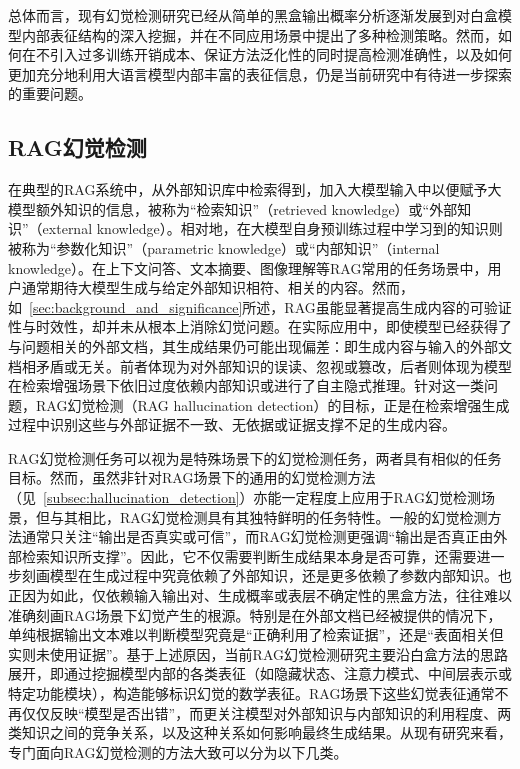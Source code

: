 
总体而言，现有幻觉检测研究已经从简单的黑盒输出概率分析逐渐发展到对白盒模型内部表征结构的深入挖掘，并在不同应用场景中提出了多种检测策略。然而，如何在不引入过多训练开销成本、保证方法泛化性的同时提高检测准确性，以及如何更加充分地利用大语言模型内部丰富的表征信息，仍是当前研究中有待进一步探索的重要问题。

\subsection{RAG幻觉检测}\label{subsec:rag_hallucination_detection}

在典型的RAG系统中，从外部知识库中检索得到，加入大模型输入中以便赋予大模型额外知识的信息，被称为“检索知识”（retrieved knowledge）或“外部知识”（external knowledge）。相对地，在大模型自身预训练过程中学习到的知识则被称为“参数化知识”（parametric knowledge）或“内部知识”（internal knowledge）。在上下文问答、文本摘要、图像理解等RAG常用的任务场景中，用户通常期待大模型生成与给定外部知识相符、相关的内容。然而，如~\ref{sec:background_and_significance}所述，RAG虽能显著提高生成内容的可验证性与时效性，却并未从根本上消除幻觉问题。在实际应用中，即使模型已经获得了与问题相关的外部文档，其生成结果仍可能出现偏差：即生成内容与输入的外部文档相矛盾或无关。前者体现为对外部知识的误读、忽视或篡改，后者则体现为模型在检索增强场景下依旧过度依赖内部知识或进行了自主隐式推理。针对这一类问题，RAG幻觉检测（RAG hallucination detection）的目标，正是在检索增强生成过程中识别这些与外部证据不一致、无依据或证据支撑不足的生成内容。

RAG幻觉检测任务可以视为是特殊场景下的幻觉检测任务，两者具有相似的任务目标。然而，虽然非针对RAG场景下的通用的幻觉检测方法（见~\ref{subsec:hallucination_detection}）亦能一定程度上应用于RAG幻觉检测场景，但与其相比，RAG幻觉检测具有其独特鲜明的任务特性。一般的幻觉检测方法通常只关注“输出是否真实或可信”，而RAG幻觉检测更强调“输出是否真正由外部检索知识所支撑”。因此，它不仅需要判断生成结果本身是否可靠，还需要进一步刻画模型在生成过程中究竟依赖了外部知识，还是更多依赖了参数内部知识。也正因为如此，仅依赖输入输出对、生成概率或表层不确定性的黑盒方法，往往难以准确刻画RAG场景下幻觉产生的根源。特别是在外部文档已经被提供的情况下，单纯根据输出文本难以判断模型究竟是“正确利用了检索证据”，还是“表面相关但实则未使用证据”。基于上述原因，当前RAG幻觉检测研究主要沿白盒方法的思路展开，即通过挖掘模型内部的各类表征（如隐藏状态、注意力模式、中间层表示或特定功能模块），构造能够标识幻觉的数学表征。RAG场景下这些幻觉表征通常不再仅仅反映“模型是否出错”，而更关注模型对外部知识与内部知识的利用程度、两类知识之间的竞争关系，以及这种关系如何影响最终生成结果。从现有研究来看，专门面向RAG幻觉检测的方法大致可以分为以下几类。


